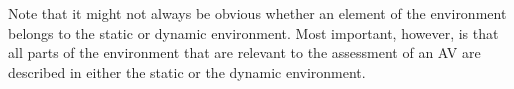 \begin{remark}
	Note that it might not always be obvious whether an element of the environment belongs to the static or dynamic environment. 
	Most important, however, is that all parts of the environment that are relevant to the assessment of an AV are described in either the static or the dynamic environment.
\end{remark}
